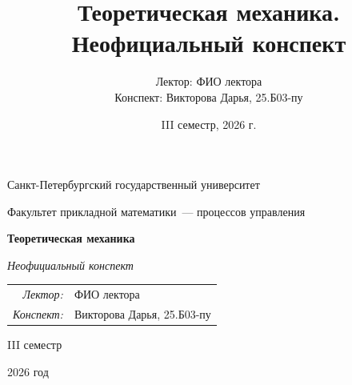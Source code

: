 \documentclass[12pt,a4paper]{report}
\title{Теоретическая механика. Неофициальный конспект}
\author{Лектор: ФИО лектора\\
Конспект: Викторова Дарья, 25.Б03-пу}
\date{III семестр, 2026 г.}
\begin{document}
\begin{titlepage}
    \thispagestyle{empty}
    \begin{center}
        \vspace*{0.6cm}

        {\large Санкт-Петербургский государственный университет\par}
        \vspace{0.35em}
        {\normalsize Факультет прикладной математики~--- процессов управления\par}

        \vspace*{5.1cm}

        {\fontsize{30}{35}\selectfont\bfseries Теоретическая механика\par}
        \vspace{0.65em}
        {\fontsize{17}{21}\selectfont\itshape Неофициальный конспект\par}

        \vspace{2.7cm}

        {\normalsize
        \begin{tabular}{@{}rl@{}}
            \textit{Лектор:} & ФИО лектора \\
            \textit{Конспект:} & Викторова Дарья, 25.Б03-пу
        \end{tabular}\par}

        \vfill

        {\large III семестр\par}
        \vspace{0.22em}
        {\large 2026 год\par}
        \vspace*{0.55cm}
    \end{center}
\end{titlepage}

\tableofcontents
\newpage

\setcounter{lection}{0}

\end{document}
